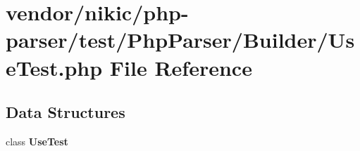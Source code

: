 \section{vendor/nikic/php-\/parser/test/\+Php\+Parser/\+Builder/\+Use\+Test.php File Reference}
\label{_use_test_8php}
\subsection*{Data Structures}
\begin{DoxyCompactItemize}
\item 
class {\bf Use\+Test}
\end{DoxyCompactItemize}
